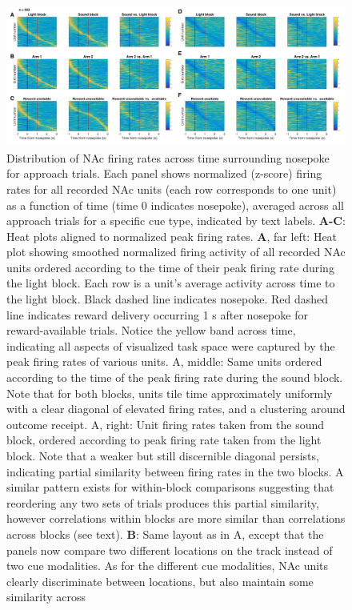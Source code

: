\documentclass[11pt]{article}
\newcommand{\bsf}[1]{\textbf{#1}}
\begin{document}
{\begin{figure}[h]
\centering
\includegraphics[width=\textwidth]{Fig 12 - NP task tiling.png}
\caption{Distribution of NAc firing rates across time surrounding nosepoke for approach
trials. Each panel shows normalized (z-score) firing rates for all recorded NAc units
(each row corresponds to one unit) as a function of time (time 0 indicates
nosepoke), averaged across all approach trials for a specific cue type,
indicated by text labels. \bsf{A-C}: Heat plots aligned to normalized peak firing rates. \bsf{A}, far left: Heat plot showing smoothed
normalized firing activity of all recorded NAc units ordered according to the
time of their peak firing rate during the light block. Each row is a unit’s
average activity across time to the light block. Black dashed line indicates
nosepoke. Red dashed line indicates reward delivery occurring 1 s after
nosepoke for reward-available trials. Notice the yellow band across time,
indicating all aspects of visualized task space were captured by the peak
firing rates of various units. A, middle: Same units ordered according to
the time of the peak firing rate during the sound block. Note that for both
blocks, units tile time approximately uniformly with a clear diagonal of
elevated firing rates, and a clustering around outcome receipt. A, right: Unit firing rates taken from the sound block, ordered according to peak
firing rate taken from the light block. Note that a weaker but still
discernible diagonal persists, indicating partial similarity between firing
rates in the two blocks. A similar pattern exists for within-block comparisons suggesting that
reordering any two sets of trials produces this partial similarity, however
correlations within blocks are more similar than correlations across blocks
(see text). \bsf{B}: Same layout as in A, except
that the panels now compare two different locations on the track instead of
two cue modalities. As for the different cue modalities, NAc units clearly
discriminate between locations, but also maintain some similarity across
}
\end{figure}}
\end{document}
